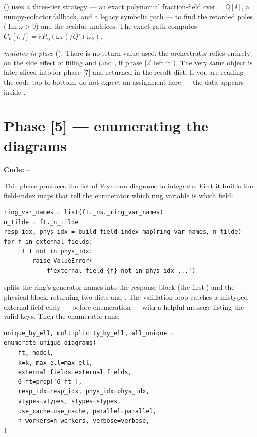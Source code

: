  () uses a
three-tier strategy --- an exact polynomial fraction-field over
 = $\mathbb{Q}[\ii]$, a numpy-cofactor fallback, and a
legacy symbolic path --- to find the retarded poles ($\operatorname{Im}\omega > 0$)
and the residue matrices. The exact path computes
$C_k[i,j] = \ii\, P_{ij}(\omega_k)/Q'(\omega_k)$.

\begin{gotcha}
 \emph{mutates  in place}
(). There is no return value used: the orchestrator
relies entirely on the side effect of filling  and
 (and , if phase [2] left it ).
The very same  object is later sliced into  for
phase [7] and returned in the result dict. If you are reading the code top to
bottom, do not expect an assignment here --- the data appears inside .
\end{gotcha}

\section{Phase [5] --- enumerating the diagrams}\label{sec:co-diagrams}

\textbf{Code:} --.

This phase produces the list of Feynman diagrams to integrate. First it builds
the field-index maps that tell the enumerator which ring variable is which field:

\begin{lstlisting}
ring_var_names = list(ft._ns._ring_var_names)
n_tilde = ft._n_tilde
resp_idx, phys_idx = build_field_index_map(ring_var_names, n_tilde)
for f in external_fields:
    if f not in phys_idx:
        raise ValueError(
            f'external field {f} not in phys_idx ...')
\end{lstlisting}

 splits the ring's generator names into the
response block (the first ) and the physical block, returning two
dicts  and . The validation loop catches a mistyped
external field early --- before enumeration --- with a helpful message listing the
valid keys. Then the enumerator runs:

\begin{lstlisting}
unique_by_ell, multiplicity_by_ell, all_unique = enumerate_unique_diagrams(
    ft, model,
    k=k, max_ell=max_ell,
    external_fields=external_fields,
    G_ft=prop['G_ft'],
    resp_idx=resp_idx, phys_idx=phys_idx,
    vtypes=vtypes, stypes=stypes,
    use_cache=use_cache, parallel=parallel,
    n_workers=n_workers, verbose=verbose,
)
\end{lstlisting}

